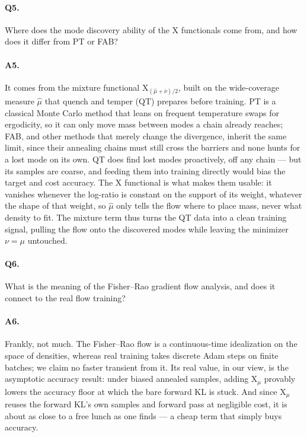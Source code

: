\documentclass{article}
\newcommand{\X}{\mathrm{X}}
\begin{document}
\paragraph{Q5.} Where does the mode discovery ability of the X functionals come
from, and how does it differ from PT or FAB?

\paragraph{A5.} It comes from the mixture functional $\X_{(\hat\mu+\bar\nu)/2}$,
built on the wide-coverage measure $\hat\mu$ that quench and temper (QT)
prepares before training. PT is a classical Monte Carlo method that leans on
frequent temperature swaps for ergodicity, so it can only move mass between
modes a chain already reaches; FAB, and other methods that merely change the
divergence, inherit the same limit, since their annealing chains must still
cross the barriers and none hunts for a lost mode on its own. QT does find lost
modes proactively, off any chain --- but its samples are coarse, and feeding
them into training directly would bias the target and cost accuracy. The X
functional is what makes them usable: it vanishes whenever the log-ratio is
constant on the support of its weight, whatever the shape of that weight, so
$\hat\mu$ only tells the flow where to place mass, never what density to fit.
The mixture term thus turns the QT data into a clean training signal, pulling
the flow onto the discovered modes while leaving the minimizer $\nu = \mu$
untouched.

\paragraph{Q6.} What is the meaning of the Fisher--Rao gradient flow analysis,
and does it connect to the real flow training?

\paragraph{A6.} Frankly, not much. The Fisher--Rao flow is a continuous-time
idealization on the space of densities, whereas real training takes discrete
Adam steps on finite batches; we claim no faster transient from it. Its real
value, in our view, is the asymptotic accuracy result: under biased annealed
samples, adding $\X_\mu$ provably lowers the accuracy floor at which the bare
forward KL is stuck. And since $\X_\mu$ reuses the forward KL's own samples and
forward pass at negligible cost, it is about as close to a free lunch as one
finds --- a cheap term that simply buys accuracy.
\end{document}
